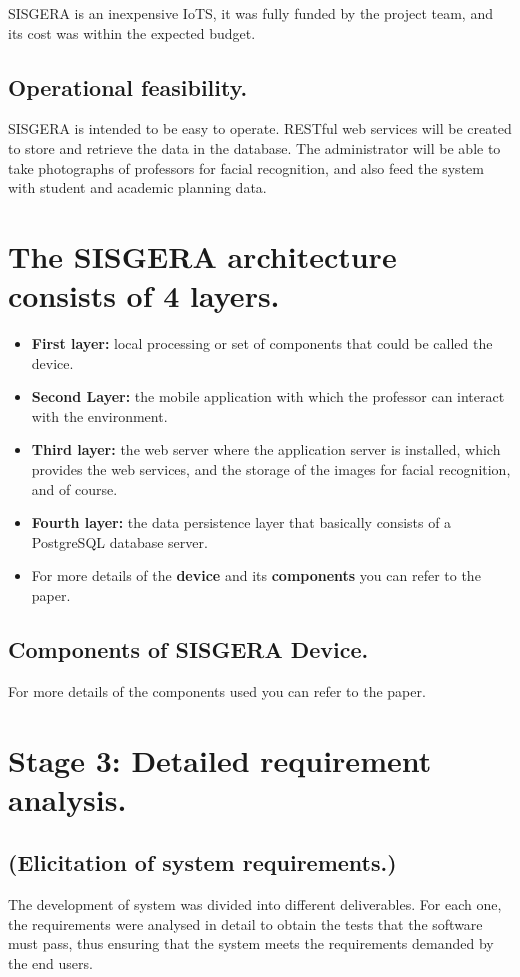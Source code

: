 \documentclass[]{scrartcl}
\begin{document}
	SISGERA is an inexpensive IoTS, it was fully funded by the project team, and its cost was within the expected budget.
	
	\subsection*{Operational feasibility.}
	SISGERA is intended to be easy to operate. RESTful web services will be created to store and retrieve the data in the database. The administrator will be able to take photographs of professors for facial recognition, and also feed the system with student and academic planning data.

\section*{The SISGERA architecture consists of 4 layers.}
	\begin{itemize}
		\item \textbf{First layer:} local processing or set of components that could be called the device.
		\item \textbf{Second Layer:} the mobile application with which the professor can interact with the environment.
		\item \textbf{Third layer:} the web server where the application server is installed, which provides the web services, and the storage of the images for facial recognition, and of course.
		\item \textbf{Fourth layer:} the data persistence layer that basically consists of a PostgreSQL database server.
		\item For more details of the \textbf{device} and its \textbf{components} you can refer to the paper.
	\end{itemize} 

	\subsection*{Components of SISGERA Device.}
		For more details of the components used you can refer to the paper.
	
\section*{Stage 3: Detailed requirement analysis.}
	\subsection*{(Elicitation of system requirements.)}
	The development of system was divided into different deliverables. For each one, the requirements were analysed in detail to obtain the tests that the software must pass, thus ensuring that the system meets the requirements demanded by the end users.
\end{document}
